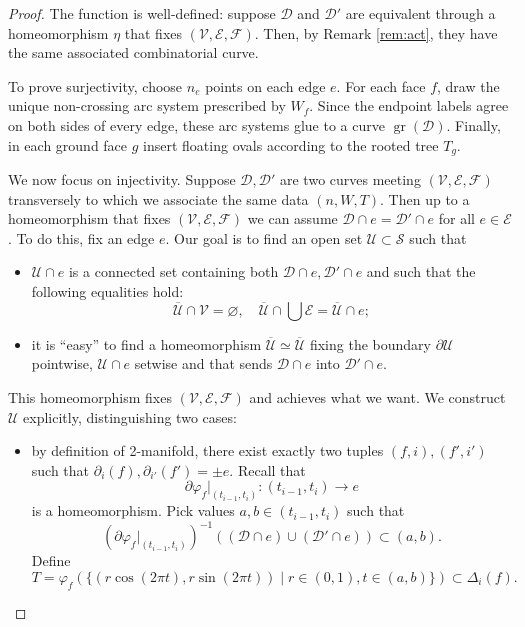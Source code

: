 \documentclass[11pt,reqno]{amsart}
\theoremstyle{plain}
\theoremstyle{definition}
\theoremstyle{remark}
\numberwithin{equation}{subsection}
\newcommand*{\calD}{\mathcal{D}}
\newcommand*{\calE}{\mathcal{E}}
\newcommand*{\calF}{\mathcal{F}}
\newcommand*{\calS}{\mathcal{S}}
\newcommand*{\calU}{\mathcal{U}}
\newcommand*{\calV}{\mathcal{V}}
\DeclareMathOperator{\gr}{gr}
\begin{document}
\begin{proof}
    The function is well-defined: suppose $\calD$ and $\calD'$ are equivalent through a homeomorphism $\eta$ that fixes $(\calV,\calE,\calF)$. Then, by Remark \ref{rem:act}, they have the same associated combinatorial curve.

    To prove surjectivity, choose $n_e$ points on each edge $e$. For each face $f$, draw the unique non-crossing arc system prescribed by $W_f$. Since the endpoint labels agree on both sides of every edge, these arc systems glue to a curve $\gr(\calD)$. Finally, in each ground face $g$ insert floating ovals according to the rooted tree $T_g$.

    We now focus on injectivity. Suppose $\calD,\calD'$ are two curves meeting $(\calV,\calE,\calF)$ transversely to which we associate the same data $(n,W,T)$. Then up to a homeomorphism that fixes $(\calV,\calE,\calF)$ we can assume $\calD\cap e=\calD'\cap e$ for all $e\in\calE$. To do this, fix an edge $e$. Our goal is to find an open set $\calU\subset\calS$ such that
    \begin{itemize}
        \item $\calU\cap e$ is a connected set containing both $\calD\cap e,\calD'\cap e$ and such that the following equalities hold:
        \begin{equation}\label{eq:closureU}
            \overline{\calU}\cap\calV=\varnothing,\quad\overline{\calU}\cap\bigcup\calE=\overline{\calU}\cap e;
        \end{equation}
        \item it is ``easy'' to find a homeomorphism $\overline{\calU}\simeq\overline{\calU}$ fixing the boundary $\partial\calU$ pointwise, $\calU\cap e$ setwise and that sends $\calD\cap e$ into $\calD'\cap e$.
    \end{itemize}
    This homeomorphism fixes $(\calV,\calE,\calF)$ and achieves what we want. We construct $\calU$ explicitly, distinguishing two cases:
    \begin{itemize}
        \item[$\underline{e\not\subset\partial\calS}$:] by definition of 2-manifold, there exist exactly two tuples $(f,i),(f',i')$ such that $\partial_i(f),\partial_{i'}(f')=\pm e$. Recall that
        \[\partial\varphi_f|_{(t_{i-1},t_i)}\colon(t_{i-1},t_i)\to e\]
        is a homeomorphism. Pick values $a,b\in(t_{i-1},t_i)$ such that \[(\partial\varphi_f|_{(t_{i-1},t_i)})^{-1}((\calD\cap e)\cup(\calD'\cap e))\subset(a,b).\]
        Define
        \[T=\varphi_f(\{(r\cos(2\pi t),r\sin(2\pi t))\mid r\in(0,1),t\in(a,b)\})\subset\Delta_i(f).\]

\end{itemize}
\end{proof}
\end{document}
